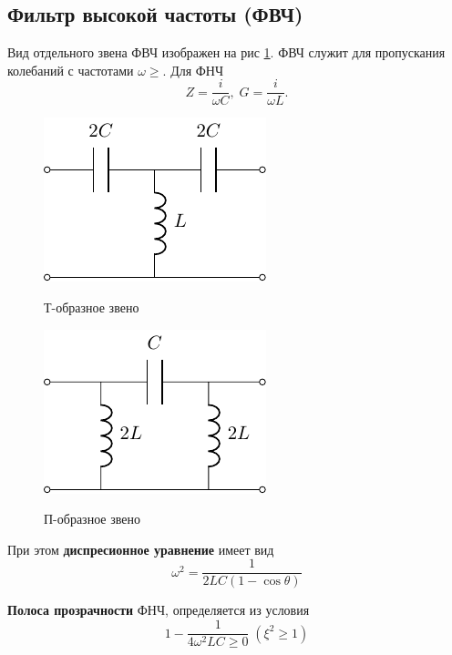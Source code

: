 \subsection{Фильтр высокой частоты (ФВЧ)} 
Вид отдельного звена ФВЧ изображен на рис \ref{fig:6.1}. ФВЧ служит для пропускания колебаний с частотами $\omega\geq$. Для ФНЧ
\begin{equation}
\label{eq:6.1.1}
Z=\frac{i}{\omega C},\;G=\frac{i}{\omega L}.
\end{equation}
\begin{figure}[h!]
	\begin{minipage}{0.49\linewidth}
		\centering
		\includegraphics[]{chem/FHF/FHFT.pdf}
		\caption*{Т-образное звено}
	\end{minipage}
	\begin{minipage}{0.49\linewidth}
		\centering
		\includegraphics[]{chem/FHF/FHFP.pdf}
		\caption*{П-образное звено}
	\end{minipage}
	\caption{}
	\label{fig:6.1}
\end{figure}
При этом \textbf{диспресионное уравнение} имеет вид 
\begin{equation}
\label{eq:6.1.2}
\omega^2=\frac{1}{2LC(1-\cos\theta)}
\end{equation}


\textbf{Полоса прозрачности} ФНЧ, определяется из условия 
\begin{equation}
\label{eq:6.1.3}
1-\frac{1}{4\omega^2LC\geq0}\;(\xi^2\geq1)
\end{equation}

